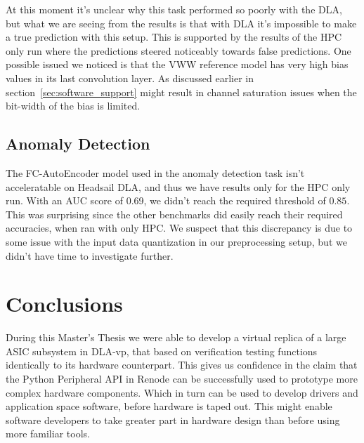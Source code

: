 \documentclass[12pt,a4paper,english
]{tunithesis}
\begin{document}
At this moment it's unclear why this task performed so poorly with the DLA, but what we are seeing from the results is that with DLA it's impossible to make a true prediction with this setup. This is supported by the results of the HPC only run where the predictions steered noticeably towards false predictions. One possible issued we noticed is that the VWW reference model has very high bias values in its last convolution layer. As discussed earlier in section~\ref{sec:software_support} might result in channel saturation issues when the bit-width of the bias is limited.

\section{Anomaly Detection}
The FC-AutoEncoder model used in the anomaly detection task isn't acceleratable on Headsail DLA, and thus we have results only for the HPC only run. With an AUC score of 0.69, we didn't reach the required threshold of $0.85$. This was surprising since the other benchmarks did easily reach their required accuracies, when ran with only HPC. We suspect that this discrepancy is due to some issue with the input data quantization in our preprocessing setup, but we didn't have time to investigate further.

\chapter{Conclusions}
\label{ch:conclusions}

During this Master's Thesis we were able to develop a virtual replica of a large ASIC subsystem in DLA-vp, that based on verification testing functions identically to its hardware counterpart. This gives us confidence in the claim that the Python Peripheral API in Renode can be successfully used to prototype more complex hardware components. Which in turn can be used to develop drivers and application space software, before hardware is taped out.
This might enable software developers to take greater part in hardware design than before using more familiar tools.
\end{document}
